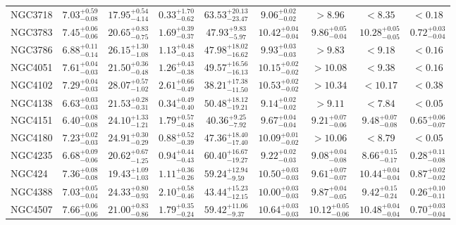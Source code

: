 \documentclass[onecolumn]{mn2e}
\begin{document}
{\begin{center}
\begin{longtable}{lcccccccc}
NGC3718 & $7.03_{-0.08}^{+0.59}$ & $17.95_{-4.14}^{+0.54}$ & $0.33_{-0.62}^{+1.70}$ &$63.53_{-23.47}^{+20.13}$ & $9.06_{-0.02}^{+0.02}$ & $>8.96$ & $<8.35$ & $<0.18$ \\
NGC3783 & $7.45_{-0.06}^{+0.06}$ & $20.65_{-0.75}^{+0.83}$ & $1.69_{-0.37}^{+0.39}$ &$47.93_{-5.97}^{+9.83}$ & $10.42_{-0.04}^{+0.04}$ & $9.86_{-0.04}^{+0.05}$ & $10.28_{-0.05}^{+0.05}$ & $0.72_{-0.04}^{+0.03}$ \\
NGC3786 & $6.88_{-0.14}^{+0.11}$ & $26.15_{-1.08}^{+1.30}$ & $1.13_{-0.43}^{+0.48}$ &$47.98_{-16.62}^{+18.02}$ & $9.93_{-0.03}^{+0.03}$ & $>9.83$ & $<9.18$ & $<0.16$ \\
NGC4051 & $7.61_{-0.03}^{+0.04}$ & $21.50_{-0.48}^{+0.36}$ & $1.26_{-0.38}^{+0.43}$ &$49.57_{-16.13}^{+16.56}$ & $10.15_{-0.02}^{+0.02}$ & $>10.08$ & $<9.38$ & $<0.16$ \\
NGC4102 & $7.29_{-0.03}^{+0.04}$ & $28.07_{-1.02}^{+0.57}$ & $2.61_{-0.49}^{+0.66}$ &$38.21_{-11.50}^{+17.38}$ & $10.53_{-0.02}^{+0.02}$ & $>10.34$ & $<10.17$ & $<0.38$ \\
NGC4138 & $6.63_{-0.03}^{+0.03}$ & $21.53_{-0.31}^{+0.28}$ & $0.34_{-0.40}^{+0.49}$ &$50.48_{-19.21}^{+18.12}$ & $9.14_{-0.02}^{+0.02}$ & $>9.11$ & $<7.84$ & $<0.05$ \\
NGC4151 & $6.40_{-0.08}^{+0.08}$ & $24.10_{-1.21}^{+1.33}$ & $1.79_{-0.48}^{+0.57}$ &$40.36_{-7.92}^{+9.25}$ & $9.67_{-0.04}^{+0.04}$ & $9.21_{-0.06}^{+0.07}$ & $9.48_{-0.08}^{+0.07}$ & $0.65_{-0.07}^{+0.06}$ \\
NGC4180 & $7.23_{-0.03}^{+0.02}$ & $24.91_{-0.29}^{+0.30}$ & $0.88_{-0.39}^{+0.52}$ &$47.36_{-17.40}^{+18.40}$ & $10.09_{-0.02}^{+0.01}$ & $>10.06$ & $<8.79$ & $<0.05$ \\
NGC4235 & $6.68_{-0.06}^{+0.09}$ & $20.62_{-1.25}^{+0.67}$ & $0.94_{-0.43}^{+0.44}$ &$60.40_{-19.27}^{+16.67}$ & $9.22_{-0.03}^{+0.02}$ & $9.08_{-0.08}^{+0.04}$ & $8.66_{-0.17}^{+0.15}$ & $0.28_{-0.08}^{+0.11}$ \\
NGC424 & $7.36_{-0.08}^{+0.08}$ & $19.43_{-1.03}^{+1.09}$ & $1.11_{-0.26}^{+0.36}$ &$59.24_{-9.59}^{+12.94}$ & $10.50_{-0.03}^{+0.03}$ & $9.61_{-0.07}^{+0.07}$ & $10.44_{-0.04}^{+0.04}$ & $0.87_{-0.02}^{+0.02}$ \\
NGC4388 & $7.03_{-0.04}^{+0.05}$ & $24.33_{-0.93}^{+0.80}$ & $2.10_{-0.46}^{+0.58}$ &$43.44_{-12.15}^{+15.23}$ & $10.00_{-0.03}^{+0.03}$ & $9.87_{-0.05}^{+0.04}$ & $9.42_{-0.24}^{+0.15}$ & $0.26_{-0.11}^{+0.10}$ \\
NGC4507 & $7.66_{-0.06}^{+0.06}$ & $21.00_{-0.86}^{+0.83}$ & $1.79_{-0.24}^{+0.35}$ &$59.42_{-9.37}^{+11.06}$ & $10.64_{-0.03}^{+0.03}$ & $10.12_{-0.06}^{+0.05}$ & $10.48_{-0.04}^{+0.04}$ & $0.70_{-0.04}^{+0.03}$ \\

\end{longtable}
\end{center}}
\end{document}
